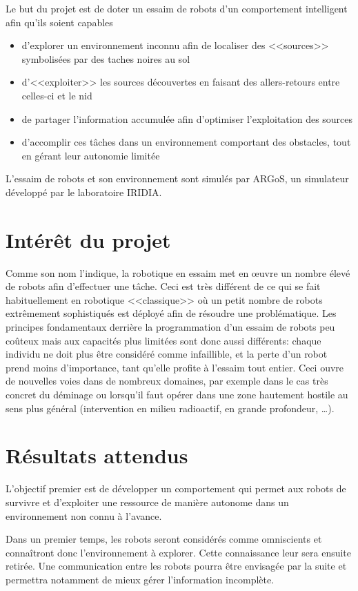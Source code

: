 Le but du projet est de doter un essaim de robots d'un comportement intelligent afin qu'ils soient capables \cite{cahierCharges}
\begin{itemize}
  \item d'explorer un environnement inconnu afin de localiser des <<sources>> symbolisées par des taches noires au sol
  \item d'<<exploiter>> les sources découvertes en faisant des allers-retours entre celles-ci et le nid
  \item de partager l'information accumulée afin d'optimiser l'exploitation des sources
  \item d'accomplir ces tâches dans un environnement comportant des obstacles, tout en gérant leur autonomie limitée
\end{itemize}
L'essaim de robots et son environnement sont simulés par ARGoS, un simulateur développé par le laboratoire IRIDIA.

\section{Intérêt du projet}

Comme son nom l'indique, la robotique en essaim met en \oe{}uvre un nombre élevé de robots afin d'effectuer une tâche. Ceci est très différent de ce qui se fait habituellement en robotique <<classique>> où un petit nombre de robots extrêmement sophistiqués est déployé afin de résoudre une problématique. Les principes fondamentaux derrière la programmation d'un essaim de robots peu coûteux mais aux capacités plus limitées sont donc aussi différents: chaque individu ne doit plus être considéré comme infaillible, et la perte d'un robot prend moins d'importance, tant qu'elle profite à l'essaim tout entier. Ceci ouvre de nouvelles voies dans de nombreux domaines, par exemple dans le cas très concret du déminage ou lorsqu'il faut opérer dans une zone hautement hostile au sens plus général (intervention en milieu radioactif, en grande profondeur, \ldots).~\cite{swarmMini}

\section{Résultats attendus}

L'objectif premier est de développer un comportement qui permet aux robots de survivre et d'exploiter une ressource de manière autonome dans un environnement non connu à l'avance.

Dans un premier temps, les robots seront considérés comme omniscients et connaîtront donc l'environnement à explorer. Cette connaissance leur sera ensuite retirée. Une communication entre les robots pourra être envisagée par la suite et permettra notamment de mieux gérer l'information incomplète.

